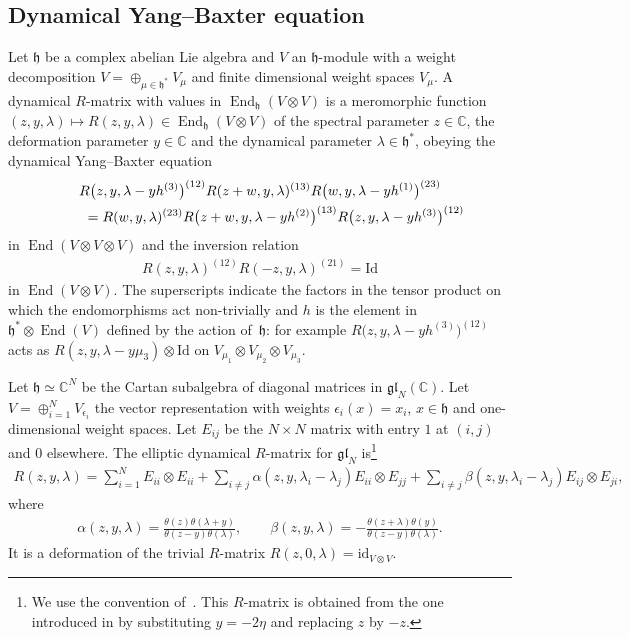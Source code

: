 \documentclass[10pt,a4paper]{amsart}
\numberwithin{equation}{section}
\begin{document}
\subsection{Dynamical Yang--Baxter equation}\label{ss-2.1}
Let $\mathfrak h$ be a complex abelian Lie algebra and $V$ an $\mathfrak h$-module with a weight decomposition $V=\oplus_{\mu\in\mathfrak h^*}V_\mu$ and finite dimensional weight spaces $V_\mu$. A dynamical $R$-matrix with values in $\operatorname{End}_{\mathfrak h}(V\otimes V)$ is a meromorphic function $(z,y,\lambda)\mapsto R(z,y,\lambda)\in\operatorname{End}_{\mathfrak h}(V\otimes V)$ of the spectral parameter $z\in\mathbb C$, the deformation parameter $y\in\mathbb C$ and the dynamical parameter $\lambda\in\mathfrak h^*$, obeying the dynamical Yang--Baxter equation
\begin{gather}
 R\big(z,y,\lambda-y h^{(3)}\big)^{(12)}R(z+w,y,\lambda)^{(13)} R\big(w,y,\lambda-y h^{(1)}\big)^{(23)} \notag\\
 \qquad {}= R(w,y,\lambda)^{(23)}R\big(z+w,y,\lambda-y h^{(2)}\big)^{(13)} R\big(z,y,\lambda-y h^{(3)}\big)^{(12)}\label{e-YBE}
\end{gather}
in $\operatorname{End}(V\otimes V\otimes V)$ and the inversion relation
\begin{gather}\label{e-inversion}
 R(z,y,\lambda)^{(12)}R(-z,y,\lambda)^{(21)}=\mathrm{Id}
\end{gather}
in $\operatorname{End}(V\otimes V)$. The superscripts indicate the factors in the tensor product on which the endomorphisms act non-trivially and $h$ is the element in $\mathfrak h^*\otimes \operatorname{End}(V)$ defined by the action of~$\mathfrak h$: for example $R\big(z,y,\lambda-y h^{(3)}\big)^{(12)}$ acts as $R(z,y,\lambda-y\mu_3)\otimes \mathrm{Id}$ on $V_{\mu_1}\otimes V_{\mu_2}\otimes V_{\mu_3}$.
\begin{Example}\label{example-1} Let $\mathfrak h\simeq\mathbb C^N$ be the Cartan subalgebra of diagonal matrices in $\mathfrak{gl}_N(\mathbb C)$. Let $V=\oplus_{i=1}^N V_{\epsilon_i}$ the vector representation with weights $\epsilon_i(x)=x_i$, $x\in\mathfrak h$ and one-dimensional weight spaces. Let $E_{ij}$ be the $N\times N$ matrix with entry $1$ at $(i,j)$ and $0$ elsewhere. The elliptic dynamical $R$-matrix
 for $\mathfrak{gl}_N$ is\footnote{We use the convention of~\cite{FelderVarchenko}. This $R$-matrix is obtained from the one introduced in \cite{Felder} by substituting $y=-2\eta$ and replacing $z$ by $-z$.}
 \begin{gather*}
 R(z,y,\lambda) =\sum_{i=1}^NE_{ii}\otimes E_{ii}+\sum_{i\neq j}\alpha(z,y,\lambda_i-\lambda_j) E_{ii}\otimes E_{jj} +\sum_{i\neq j}\beta(z,y,\lambda_i-\lambda_j) E_{ij}\otimes E_{ji},
 \end{gather*}
 where
 \begin{gather*}
 \alpha(z,y,\lambda)= \frac{\theta(z)\theta(\lambda+y)}{\theta(z-y)\theta(\lambda)}, \qquad \beta(z,y,\lambda)= -\frac{\theta(z+\lambda)\theta(y)}{\theta(z-y)\theta(\lambda)}.
 \end{gather*}
 It is a deformation of the trivial $R$-matrix $R(z,0,\lambda)=\mathrm{id}_{V\otimes V}$.
\end{Example}
\end{document}
